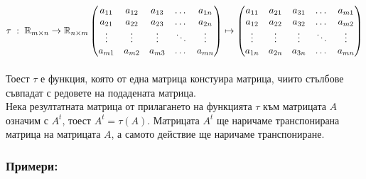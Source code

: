 \documentclass[12pt]{article}
\newcommand{\R}{\mathbb{R}}
\begin{document}
$\tau \; : \; \R_{m \times n} \to \R_{n \times m} \\\\
\begin{pmatrix}
    a_{11} & a_{12} & a_{13} & \dots  & a_{1n} \\
    a_{21} & a_{22} & a_{23} & \dots  & a_{2n} \\
    \vdots & \vdots & \vdots & \ddots & \vdots \\
    a_{m1} & a_{m2} & a_{m3} & \dots  & a_{mn}
\end{pmatrix} \mapsto \begin{pmatrix}
    a_{11} & a_{21} & a_{31} & \dots  & a_{m1} \\
    a_{12} & a_{22} & a_{32} & \dots  & a_{m2} \\
    \vdots & \vdots & \vdots & \ddots & \vdots \\
    a_{1n} & a_{2n} & a_{3n} & \dots  & a_{mn}
\end{pmatrix}$ \\\\

Тоест $\tau$ е функция, която от една матрица констуира матрица, чиито стълбове съвпадат с редовете на подадената матрица. \\

Нека резултатната матрица от прилагането на функцията $\tau$ към матрицата $A$ означим с $A^t$, тоест $A^t = \tau(A)$.
Матрицата $A^t$ ще наричаме транспонирана матрица на матрицата $A$, а самото действие ще наричаме транспониране. 

\subsubsection*{Примери:}
\end{document}

